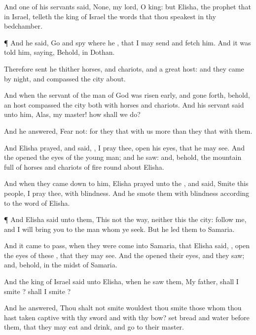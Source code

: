{And
one of his
servants
said, None, my
lord, O
king: but
Elisha, the
prophet that
{} in
Israel,
telleth the
king of
Israel the
words that thou
speakest in thy
bedchamber.


\par }{\PP {}¶ And he
said,
Go and
spy
where he
{}, that I may
send and
fetch him. And it was
told him,
saying, Behold,
{} in
Dothan.

Therefore
sent he thither
horses, and
chariots, and a
great
host: and they
came by
night, and
compassed the
city
about.

And when the
servant of the
man of
God was
risen
early, and gone
forth, behold, an
host
compassed the
city both with
horses and
chariots. And his
servant
said unto him,
Alas, my
master! how shall we
do?

And he
answered,
Fear not: for they that
{} with us
{}
more than they that
{} with them.

And
Elisha
prayed, and
said,
{}, I pray thee,
open his
eyes, that he may
see. And the
{}
opened the
eyes of the young
man; and he
saw: and, behold, the
mountain
{}
full of
horses and
chariots of
fire round
about
Elisha.

And when they came
down to him,
Elisha
prayed unto the
{}, and
said,
Smite this
people, I pray thee, with
blindness. And he
smote them with
blindness according to the
word of
Elisha.


\par }{\PP {}¶ And
Elisha
said unto them, This
{} not the
way, neither
{}
this the
city:
follow me, and I will
bring you to the
man whom ye
seek. But he
led them to
Samaria.

And it came to pass, when they were
come into
Samaria, that
Elisha
said,
{},
open the
eyes of these
{}, that they may
see. And the
{}
opened their
eyes, and they
saw; and, behold,
{} in the
midst of
Samaria.

And the
king of
Israel
said unto
Elisha, when he
saw them, My
father, shall I
smite
{}? shall I
smite
{}?

And he
answered, Thou shalt not
smite
{} wouldest thou
smite those whom thou hast taken
captive with thy
sword and with thy
bow?
set
bread and
water
before them, that they may
eat and
drink, and
go to their
master.

}
